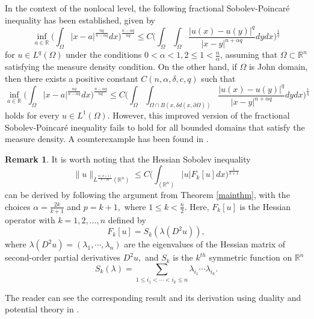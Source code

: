 \documentclass[12pt]{amsart}
\newcommand{\R}{\mathbb{R}}
\newcommand{\be}{\begin{equation}}
\newcommand{\ee}{\end{equation}}
\numberwithin{equation}{section}
\theoremstyle{plain}
\theoremstyle{definition}
\newtheorem{Rem}[Thm]{Remark}
\theoremstyle{remark}
\begin{document}
In the context of the nonlocal level, the following fractional Sobolev-Poincar\'{e} inequality has been established, given by
\be\label{poincare}
\inf_{a\in\mathbb{R}}\Big( \int_{\Omega}|x-a|^{\frac{nq}{n-\alpha q}}dx\Big)^{\frac{n-\alpha q}{nq}} \leq C\Big(\int_{\Omega}\int_{\Omega} {\frac{{|u(x)-u(y)|}^{q}}{{|x-y|}^{n+\alpha q}}}dydx\Big)^{\frac{1}{q}}
\ee
for $u\in L^{q}(\Omega)$ under the conditions $0<\alpha<1, 2\leq 1<\frac{n}{\alpha}$, assuming that $\Omega\subset\R^{n}$ satisfying the measure density condition. On the other hand, if  $\Omega$ is John domain, then there exists a positive constant $C(n,\alpha,\delta,c,q)$ such that
 \[
\inf_{a\in\mathbb{R}}\Big( \int_{\Omega}|x-a|^{\frac{nq}{n-\alpha q}}dx\Big)^{\frac{n-\alpha q}{nq}} \leq C\Big(\int_{\Omega}\int_{\Omega\cap B(x, \delta d(x,\partial \Omega))} {\frac{{|u(x)-u(y)|}^{q}}{{|x-y|}^{n+\alpha q}}}dydx\Big)^{\frac{1}{q}}
\]
holds for every $u\in L^{1}(\Omega).$ However, this improved version of the fractional Sobolev-Poincar\'{e} inequality fails to hold for all bounded domains that satisfy the measure density. A counterexample has been found in \cite{BLV}. 
\begin{Rem}
It is worth noting that  the Hessian Sobolev inequality 
\[ \label{hessianineq}
\|u\|_{L^{\frac{n(k+1)}{n-2k}}(\R^{n})}\leq C \Big( \int_{(\R^{n})}|u| F_{k}[u] dx\Big)^{\frac{1}{k+1}}
 \]
can be derived by following the argument from Theorem \ref{mainthm}, with the choices $\alpha=\frac{2k}{k+1}$ and $p=k+1,$ where $1\leq k<\frac{n}{2}.$ Here,
 $F_{k}[u]$ is the Hessian operator with $k=1,2,\dots,n$ defined by
\[
F_{k}[u]=S_{k}(\lambda(D^{2}u)),         
\]
where $\lambda(D^{2}u)=(\lambda_{1},\cdots,\lambda_{n})$ are the eigenvalues of the Hessian matrix of second-order partial derivatives $D^{2}u,$ and $S_{k}$ is the $k^{th}$ symmetric function on $\R^{n}$
\[
S_{k}(\lambda)= \sum_{1\leq i_{1}<\cdots<i_{k}\leq n}\lambda_{i_{1}}\cdots\lambda_{i_{k}}.
\]

The reader can see the corresponding result and its derivation using duality and potential theory in \cite{V15}.
\end{Rem}
\end{document}
